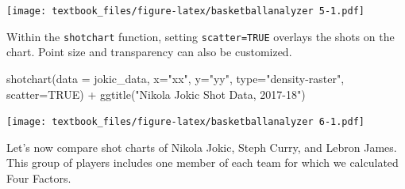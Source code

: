 \documentclass[
  11pt,
]{book}
\newenvironment{Shaded}{\begin{snugshade}}{\end{snugshade}}
\newcommand{\AttributeTok}[1]{\textcolor[rgb]{0.77,0.63,0.00}{#1}}
\newcommand{\CommentTok}[1]{\textcolor[rgb]{0.56,0.35,0.01}{\textit{#1}}}
\newcommand{\ConstantTok}[1]{\textcolor[rgb]{0.00,0.00,0.00}{#1}}
\newcommand{\DecValTok}[1]{\textcolor[rgb]{0.00,0.00,0.81}{#1}}
\newcommand{\FloatTok}[1]{\textcolor[rgb]{0.00,0.00,0.81}{#1}}
\newcommand{\FunctionTok}[1]{\textcolor[rgb]{0.00,0.00,0.00}{#1}}
\newcommand{\NormalTok}[1]{#1}
\newcommand{\OtherTok}[1]{\textcolor[rgb]{0.56,0.35,0.01}{#1}}
\newcommand{\SpecialCharTok}[1]{\textcolor[rgb]{0.00,0.00,0.00}{#1}}
\newcommand{\StringTok}[1]{\textcolor[rgb]{0.31,0.60,0.02}{#1}}
\theoremstyle{definition}
\theoremstyle{definition}
\theoremstyle{definition}
\theoremstyle{definition}
\theoremstyle{remark}
\begin{document}
\texttt{[image: textbook\_files/figure-latex/basketballanalyzer 5-1.pdf]}

Within the \texttt{shotchart} function, setting \texttt{scatter=TRUE} overlays the shots on the chart. Point size and transparency can also be customized.

\begin{Shaded}
\begin{Highlighting}[]
\FunctionTok{shotchart}\NormalTok{(}\AttributeTok{data =}\NormalTok{ jokic\_data, }\AttributeTok{x=}\StringTok{"xx"}\NormalTok{, }\AttributeTok{y=}\StringTok{"yy"}\NormalTok{, }\AttributeTok{type=}\StringTok{"density{-}raster"}\NormalTok{, }\AttributeTok{scatter=}\ConstantTok{TRUE}\NormalTok{) }\SpecialCharTok{+} 
  \FunctionTok{ggtitle}\NormalTok{(}\StringTok{"Nikola Jokic Shot Data, 2017{-}18"}\NormalTok{)}
\end{Highlighting}
\end{Shaded}

\texttt{[image: textbook\_files/figure-latex/basketballanalyzer 6-1.pdf]}

Let's now compare shot charts of Nikola Jokic, Steph Curry, and Lebron James. This group of players includes one member of each team for which we calculated Four Factors.

\begin{Shaded}
\end{Shaded}
\end{document}
